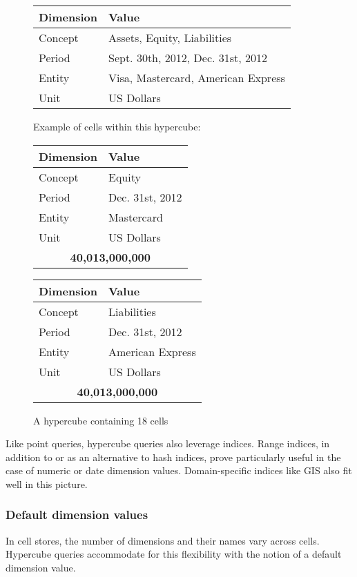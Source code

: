 \documentclass{vldb}
\begin{document}
\begin{figure}
\caption{A hypercube containing 18 cells}
\label{fig-hypercube}
\begin{tabular}{|l|l|}
\hline
Dimension & Value \\
\hline
Concept & Assets, Equity, Liabilities \\
Period & Sept. 30th, 2012, Dec. 31st, 2012 \\
Entity & Visa, Mastercard, American Express \\
Unit & US Dollars \\
\hline
\end{tabular}

Example of cells within this hypercube:

\begin{tabular}{|l|l|}
\hline
Dimension & Value \\
\hline
Concept & Equity \\
Period & Dec. 31st, 2012 \\
Entity & Mastercard \\
Unit & US Dollars \\
\hline
\multicolumn{2}{|c|}{\textbf{40,013,000,000}} \\
\hline
\end{tabular}
\begin{tabular}{|l|l|}
\hline
Dimension & Value \\
\hline
Concept & Liabilities \\
Period & Dec. 31st, 2012 \\
Entity & American Express \\
Unit & US Dollars \\
\hline
\multicolumn{2}{|c|}{\textbf{40,013,000,000}} \\
\hline
\end{tabular}
\end{figure}

Like point queries, hypercube queries also leverage indices. Range indices, in addition to or as an alternative to hash indices, prove particularly useful in the case of numeric or date dimension values. Domain-specific indices like GIS also fit well in this picture.

\subsubsection{Default dimension values}

In cell stores, the number of dimensions and their names vary across cells. Hypercube queries accommodate for this flexibility with the notion of a default dimension value.
\end{document}
